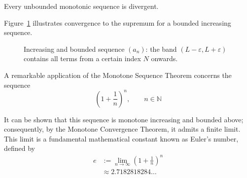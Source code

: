 \begin{theorem}
Every unbounded monotonic sequence is divergent.
\end{theorem}

Figure~\ref{fig:ch3-monotone-convergence} illustrates convergence to the supremum for a bounded increasing sequence.

\begin{figure}[!htbp]
\centering
{}
\caption[Convergence of a bounded monotone sequence]{Increasing and bounded
  sequence $(a_n)$: the band $(L-\varepsilon,L+\varepsilon)$ contains all terms from a certain
  index $N$ onwards.}
\label{fig:ch3-monotone-convergence}
\end{figure}

A remarkable application of the Monotone Sequence Theorem concerns the sequence
\[
\left( 1 + \frac{1}{n} \right)^n, \qquad n \in \mathbb{N}
\]

It can be shown that this sequence is monotone increasing and bounded above; consequently, by the Monotone
Convergence Theorem, it admits a finite limit. This limit is a fundamental mathematical constant known as Euler's
number, defined by
\[
\begin{aligned}
e &:= \lim_{n \to \infty} \left( 1 + \frac{1}{n} \right)^n \\
&\approx 2.7182818284\ldots
\end{aligned}
\]


